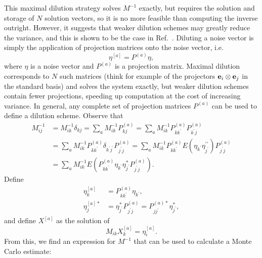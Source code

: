 This maximal dilution strategy solves $M^{-1}$ exactly, but requires the solution and storage of $N$ solution vectors, so it is no more feasible than computing the inverse outright. However, it suggests that weaker dilution schemes may greatly reduce the variance, and this is shown to be the case in Ref.~\cite{Morningstar:2011ka}. Diluting a noise vector is simply the application of projection matrices onto the noise vector, i.e.
\begin{equation}
    \eta^{[a]} = P^{(a)} \eta,
\end{equation}
where $\eta$ is a noise vector and $P^{(a)}$ is a projection matrix. Maximal dilution corresponds to $N$ such matrices (think for example of the projectors $\vb e_i \otimes \vb e_j$ in the standard basis) and solves the system exactly, but weaker dilution schemes contain fewer projections, speeding up computation at the cost of increasing variance. In general, any complete set of projection matrices $P^{(a)}$ can be used to define a dilution scheme. Observe that
\begin{equation}
\begin{aligned} M_{i j}^{-1} &=M_{i k}^{-1} \delta_{k j}=\sum_{a} M_{i k}^{-1} P_{k j}^{(a)}=\sum_{a} M_{i k}^{-1} P_{k k^{\prime}}^{(a)} P_{k^{\prime} j}^{(a)} \\ &=\sum_{a} M_{i k}^{-1} P_{k k^{\prime}}^{(a)} \delta_{k^{\prime} j^{\prime}} P_{j^{\prime} j}^{(a)}=\sum_{a} M_{i k}^{-1} P_{k k^{\prime}}^{(a)} E\left(\eta_{k^{\prime}} \eta_{j^{\prime}}^{\prime \prime}\right) P_{j^{\prime} j}^{(a)} \\ &=\sum_{a} M_{i k}^{-1} E\left(P_{k k^{\prime}}^{(a)} \eta_{k^{\prime}} \eta_{j^{\prime}}^{*} P_{j^{\prime} j}^{(a)}\right). \end{aligned}
\end{equation}
Define
\begin{equation}
    \begin{aligned}
    \eta_{k}^{[a]}&=P_{k k^{\prime}}^{(a)} \eta_{k^{\prime}},\\
    \eta_{j}^{[a] *}&=\eta_{j^{\prime}}^{*} P_{j^{\prime} j}^{(a)}=P_{j j^{\prime}}^{(a) *} \eta_{j^{\prime}}^{*},
    \end{aligned}
\end{equation}
and define $X^{[a]}$ as the solution of
\begin{equation}
    M_{i k} X_{k}^{[a]}=\eta_{i}^{[a]}.
\end{equation}
From this, we find an expression for $M^{-1}$ that can be used to calculate a Monte Carlo estimate:
